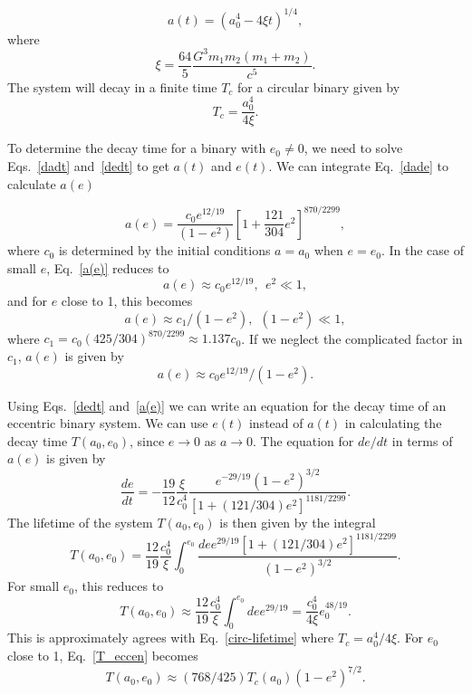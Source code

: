 \begin{equation}\label{a(t)}
    a(t) = (a_0^4 - 4\xi t)^{1/4},
\end{equation}
where
\begin{equation}
    \xi = \frac{64}{5}\frac{G^3m_1m_2(m_1+m_2)}{c^5}.
\end{equation}
The system will decay in a finite time $T_c$ for a circular binary given by
\begin{equation}\label{circ-lifetime}
    T_c = \frac{a_0^4}{4\xi}.
\end{equation}

To determine the decay time for a binary with $e_0 \neq 0$, we need to solve Eqs.~\ref{dadt} and~\ref{dedt} to get $a(t)$ and $e(t)$. We can integrate Eq.~\ref{dade} to calculate $a(e)$ 

\begin{equation}\label{a(e)}
    a(e) = \frac{c_0e^{12/19}}{(1-e^2)}\left[1+\frac{121}{304}e^2\right]^{870/2299},
\end{equation}
where $c_0$ is determined by the initial conditions $a=a_0$ when $e=e_0$. In the case of small $e$, Eq.~\ref{a(e)} reduces to
\begin{equation}
    a(e) \approx c_0e^{12/19},~~e^2 \ll 1,
\end{equation}
and for $e$ close to 1, this becomes
\begin{equation}
    a(e) \approx c_1/(1-e^2),~~(1-e^2) \ll 1,
\end{equation}
where $c_1 = c_0(425/304)^{870/2299} \approx 1.137c_0$. If we neglect the complicated factor in $c_1$, $a(e)$ is given by
\begin{equation}
    a(e) \approx c_0e^{12/19}/(1-e^2).
\end{equation}

Using Eqs.~\ref{dedt} and~\ref{a(e)} we can write an equation for the decay time of an eccentric binary system. We can use $e(t)$ instead of $a(t)$ in calculating the decay time $T(a_0,e_0)$, since $e \to 0$ as $a \to 0$. The equation for $de/dt$ in terms of $a(e)$ is given by
\begin{equation}
    \frac{de}{dt} = -\frac{19}{12}\frac{\xi}{c_0^4}\frac{e^{-29/19}(1-e^2)^{3/2}}{[1+(121/304)e^2]^{1181/2299}}.
\end{equation}
The lifetime of the system $T(a_0,e_0)$ is then given by the integral
\begin{equation}\label{T_eccen}
    T(a_0,e_0) = \frac{12}{19}\frac{c_0^4}{\xi}\int_0^{e_0} \frac{de e^{29/19}[1+(121/304)e^2]^{1181/2299}}{(1-e^2)^{3/2}}.
\end{equation}
For small $e_0$, this reduces to
\begin{equation}
    T(a_0,e_0) \approx \frac{12}{19}\frac{c_0^4}{\xi}\int_0^{e_0}de e^{29/19} = \frac{c_0^4}{4\xi} e_0^{48/19}. 
\end{equation}
This is approximately agrees with Eq.~\ref{circ-lifetime} where $T_c = a_0^4/4\xi$. For $e_0$ close to 1, Eq.~\ref{T_eccen} becomes
\begin{equation}
    T(a_0,e_0) \approx (768/425)T_c(a_0)(1-e^2)^{7/2}.
\end{equation}

